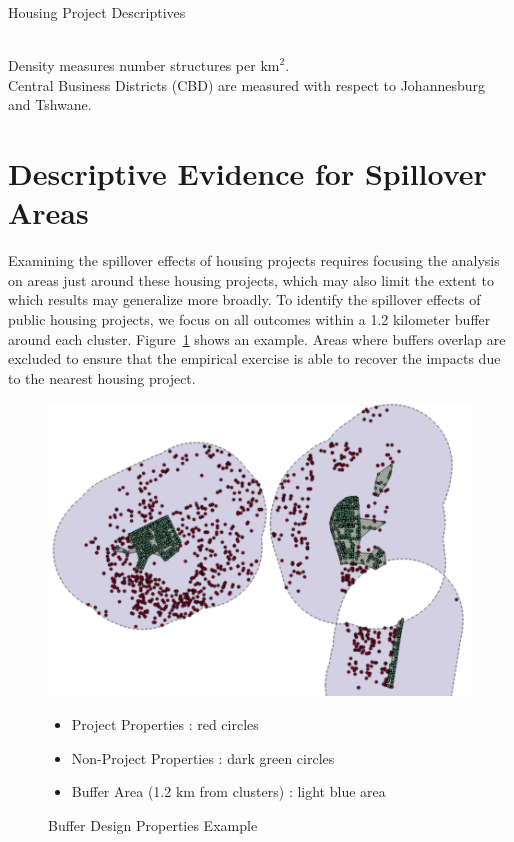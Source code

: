 \documentclass[12pt]{article}
\begin{document}
\begin{table}
	\centering
	\caption{Housing Project Descriptives}\label{table:projectdescriptives}
\\
Density measures number structures per $\text{km}^2$. \\  Central Business Districts (CBD) are measured with respect to Johannesburg and Tshwane.
\end{table}

\section{Descriptive Evidence for Spillover Areas}

Examining the spillover effects of housing projects requires focusing the analysis on areas just around these housing projects, which may also limit the extent to which results may generalize more broadly.  To identify the spillover effects of public housing projects, we focus on all outcomes within a 1.2 kilometer buffer around each cluster.  Figure~\ref{figure:bufferdesign} shows an example.  Areas where buffers overlap are excluded to ensure that the empirical exercise is able to recover the impacts due to the nearest housing project.  

\begin{figure}
\caption{Buffer Design Properties Example}\label{figure:bufferdesign}
\centering
\includegraphics[scale=.4]{figures/design.png} 
\begin{itemize}
\item Project Properties : red circles
\item Non-Project Properties : dark green circles
\item Buffer Area (1.2 km from clusters) : light blue area
\end{itemize}
\end{figure}
\end{document}
